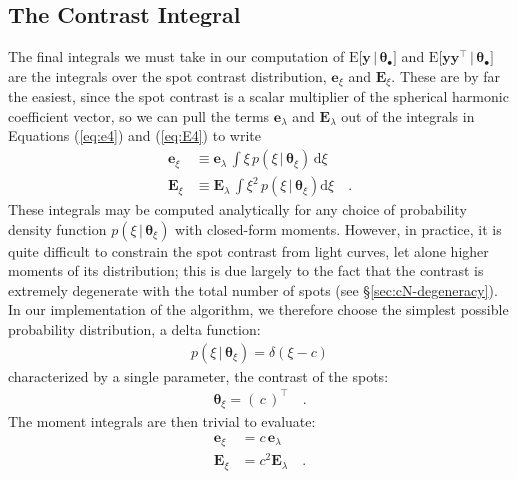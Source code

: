 \documentclass[modern]{aastex62}
\begin{document}
\subsection{The Contrast Integral}
\label{sec:contrast}
%
The final integrals we must take in our computation of
$\mathrm{E} \big[ \mathbf{y} \, \big| \, \pmb{\theta}_\bullet \big]$
and $\mathrm{E} \big[ \mathbf{y} \mathbf{y}^\top \, \big| \, \pmb{\theta}_\bullet \big]$
are the integrals over
the spot contrast distribution, $\mathbf{e}_\xi$ and $\mathbf{E}_\xi$.
These are by far the easiest, since the spot contrast is a scalar
multiplier of the spherical harmonic coefficient vector, so we can
pull the terms $\mathbf{e}_\lambda$ and $\mathbf{E}_\lambda$ out
of the
integrals in Equations (\ref{eq:e4}) and (\ref{eq:E4}) to write
%
\begin{align}
    \mathbf{e}_\xi
     & \equiv
    \mathbf{e}_\lambda \,
    \int
    \xi \,
    p(\xi \, \big| \, \pmb{\theta}_{\xi}) \,
    \mathrm{d}\xi
    \\
    \mathbf{E}_\xi
     & \equiv
    \mathbf{E}_\lambda \,
    \int
    \xi^2 \,
    p(\xi \, \big| \, \pmb{\theta}_\xi)
    \mathrm{d}\xi
    \quad.
\end{align}
%
These integrals may be computed analytically for any choice of
probability density function $p(\xi \, \big| \, \pmb{\theta}_\xi)$
with closed-form moments.
%
However, in practice, it is quite difficult to constrain the
spot contrast from light curves, let alone higher moments of its
distribution; this is due largely to the fact that the contrast
is extremely degenerate with the total number of spots
(see \S\ref{sec:cN-degeneracy}).
%
In our implementation of the algorithm,
we therefore choose the simplest possible probability distribution,
a delta function:
%
\begin{align}
    p(\xi \, \big| \, \pmb{\theta}_{\xi}) = \delta(\xi - c)
\end{align}
%
characterized by a single parameter, the contrast of the spots:
%
\begin{align}
    \pmb{\theta}_\xi = \left( \, c \, \right)^\top
    \quad.
\end{align}
%
The moment integrals are then trivial to evaluate:
%
\begin{align}
    \mathbf{e}_\xi & = c \, \mathbf{e}_\lambda
    \\
    \mathbf{E}_\xi & = c^2 \mathbf{E}_\lambda
    \quad.
\end{align}
%
\end{document}

